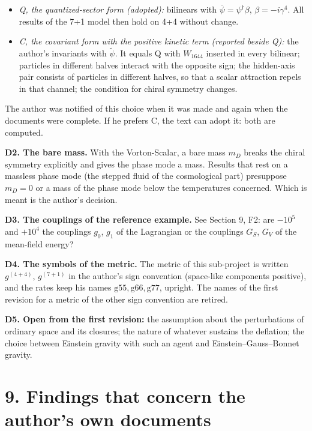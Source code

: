 \documentclass[
  10pt,
]{article}
\providecommand{\tightlist}{%
  \setlength{\itemsep}{0pt}\setlength{\parskip}{0pt}}
\begin{document}
\begin{itemize}
\tightlist
\item
  \emph{Q, the quantized-sector form (adopted):} bilinears with
  \(\bar\psi=\psi^\dagger\beta\), \(\beta=-i\gamma^4\). All results of
  the 7+1 model then hold on 4+4 without change.
\item
  \emph{C, the covariant form with the positive kinetic term (reported
  beside Q):} the author's invariants with \(\tilde\psi\). It equals Q
  with \(W_{1644}\) inserted in every bilinear; particles in different
  halves interact with the opposite sign; the hidden-axis pair consists
  of particles in different halves, so that a scalar attraction repels
  in that channel; the condition for chiral symmetry changes.
\end{itemize}

The author was notified of this choice when it was made and again when
the documents were complete. If he prefers C, the text can adopt it:
both are computed.

\textbf{D2. The bare mass.} With the Vorton-Scalar, a bare mass \(m_D\)
breaks the chiral symmetry explicitly and gives the phase mode a mass.
Results that rest on a massless phase mode (the stepped fluid of the
cosmological part) presuppose \(m_D=0\) or a mass of the phase mode
below the temperatures concerned. Which is meant is the author's
decision.

\textbf{D3. The couplings of the reference example.} See Section 9, F2:
are \(-10^5\) and \(+10^4\) the couplings \(g_0\), \(g_1\) of the
Lagrangian or the couplings \(G_S\), \(G_V\) of the mean-field energy?

\textbf{D4. The symbols of the metric.} The metric of this sub-project
is written \(g^{(4+4)}\), \(g^{(7+1)}\) in the author's sign convention
(space-like components positive), and the rates keep his names
\(\mathrm{g55},\mathrm{g66},\mathrm{g77}\), upright. The names of the
first revision for a metric of the other sign convention are retired.

\textbf{D5. Open from the first revision:} the assumption about the
perturbations of ordinary space and its closures; the nature of whatever
sustains the deflation; the choice between Einstein gravity with such an
agent and Einstein--Gauss--Bonnet gravity.

\hypertarget{findings-that-concern-the-authors-own-documents}{%
\section{9. Findings that concern the author's own
documents}\label{findings-that-concern-the-authors-own-documents}}
\end{document}
